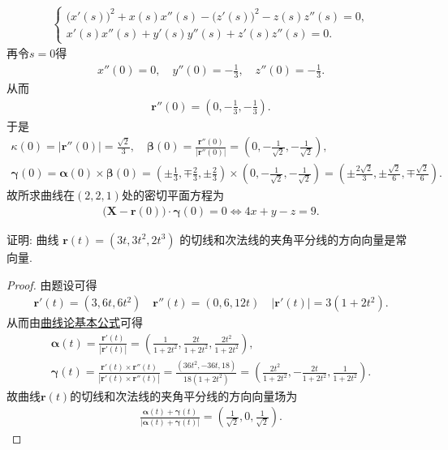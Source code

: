 \documentclass[../../main.tex]{subfiles}%
\begin{document}
\begin{solution}
\begin{align*}
\begin{cases}
\big(x'(s)\big)^2 + x(s)x''(s) - \big(z'(s)\big)^2 - z(s)z''(s) = 0, \\
x'(s)x''(s) + y'(s)y''(s) + z'(s)z''(s) = 0.
\end{cases}
\end{align*}
再令$s=0$得
\begin{align*}
x''(0) = 0, \quad y''(0) = -\frac{1}{3}, \quad z''(0) = -\frac{1}{3}.
\end{align*}
从而
\begin{align*}
\bm{r}''(0) = \left( 0, -\frac{1}{3}, -\frac{1}{3} \right).
\end{align*}
于是
\begin{gather*}
\kappa(0) = \big| \bm{r}''(0) \big| = \frac{\sqrt{2}}{3}, \quad \bm{\beta}(0) = \frac{\bm{r}''(0)}{\big| \bm{r}''(0) \big|} = \left( 0, -\frac{1}{\sqrt{2}}, -\frac{1}{\sqrt{2}} \right), \\
\bm{\gamma}(0) = \bm{\alpha}(0) \times \bm{\beta}(0) = \left( \pm \frac{1}{3}, \mp \frac{2}{3}, \pm \frac{2}{3} \right) \times \left( 0, -\frac{1}{\sqrt{2}}, -\frac{1}{\sqrt{2}} \right) = \left( \pm \frac{2\sqrt{2}}{3}, \pm \frac{\sqrt{2}}{6}, \mp \frac{\sqrt{2}}{6} \right).
\end{gather*}
故所求曲线在$(2,2,1)$处的密切平面方程为
\begin{align*}
\big( \bm{X} - \bm{r}(0) \big) \cdot \bm{\gamma}(0) = 0 \Longleftrightarrow 4x + y - z = 9.
\end{align*}

\end{solution}

\begin{example}
证明: 曲线 $\bm{r}(t) = (3t, 3t^2, 2t^3)$ 的切线和次法线的夹角平分线的方向向量是常向量.
\end{example}
\begin{proof}
由题设可得
\begin{align*}
\bm{r}'(t) = \left(3,6t,6t^2\right) \quad \bm{r}''(t) = \left(0,6,12t\right) \quad |\bm{r}'(t)| = 3\left(1+2t^2\right).
\end{align*}
从而由\hyperref[theorem:曲线论基本公式]{曲线论基本公式}可得
\begin{gather*}
\bm{\alpha}(t) = \frac{\bm{r}'(t)}{|\bm{r}'(t)|} = \left( \frac{1}{1+2t^2}, \frac{2t}{1+2t^2}, \frac{2t^2}{1+2t^2} \right), \\
\bm{\gamma}(t) = \frac{\bm{r}'(t) \times \bm{r}''(t)}{|\bm{r}'(t) \times \bm{r}''(t)|} = \frac{\left(36t^2,-36t,18\right)}{18\left(1+2t^2\right)} = \left( \frac{2t^2}{1+2t^2}, -\frac{2t}{1+2t^2}, \frac{1}{1+2t^2} \right).
\end{gather*}
故曲线$\bm{r}(t)$的切线和次法线的夹角平分线的方向向量场为
\begin{align*}
\frac{\boldsymbol{\alpha }\left( t \right) +\boldsymbol{\gamma }\left( t \right)}{\left| \boldsymbol{\alpha }\left( t \right) +\boldsymbol{\gamma }\left( t \right) \right|}=\left( \frac{1}{\sqrt{2}},0,\frac{1}{\sqrt{2}} \right) .
\end{align*}
\end{proof}
\end{document}
